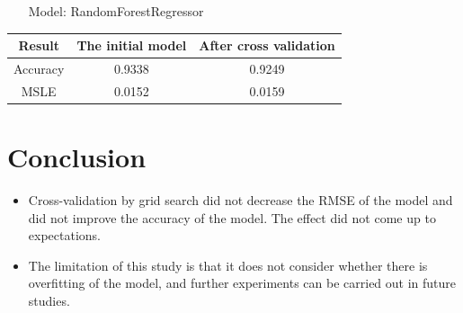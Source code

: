 \begin{itemize}
  	\item[Model:] RandomForestRegressor
    
\end{itemize}
\begin{tabular}{ c | c | c  }
    \toprule
    Result     &  The initial model    & After cross validation       \\
    \midrule
    Accuracy       &  0.9338   &  0.9249       \\

    MSLE      &  0.0152   &  0.0159     \\

     
    \bottomrule
\end{tabular}



\section{Conclusion}\label{sec-conclusions}

\begin{itemize}
  \item
    Cross-validation by grid search did not decrease the RMSE of the model and did not improve the accuracy of the model.
  The effect did not come up to expectations.
  \item
  The limitation of this study is that it does not consider whether there is overfitting of the model, and further experiments can be carried out in future studies.
\end{itemize}




